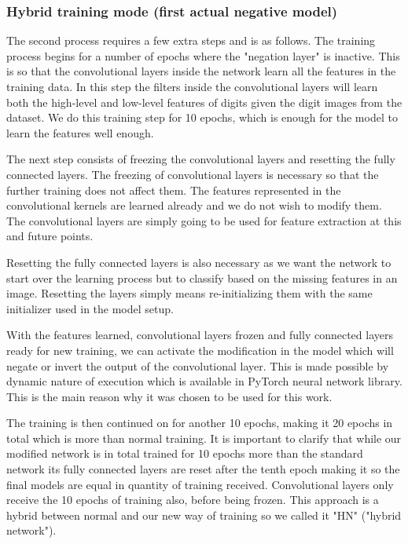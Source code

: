 \documentclass[b5paper]{book}
\begin{document}
\subsubsection{Hybrid training mode (first actual negative model)}

The second process requires a few extra steps and is as follows. The training process begins for a number of epochs where the "negation layer" is inactive. This is so that the convolutional layers inside the network learn all the features in the training data. In this step the filters inside the convolutional layers will learn both the high-level and low-level features of digits given the digit images from the dataset. We do this training step for 10 epochs, which is enough for the model to learn the features well enough.

The next step consists of freezing the convolutional layers and resetting the fully connected layers. The freezing of convolutional layers is necessary so that the further training does not affect them. The features represented in the convolutional kernels are learned already and we do not wish to modify them. The convolutional layers are simply going to be used for feature extraction at this and future points. 

Resetting the fully connected layers is also necessary as we want the network to start over the learning process but to classify based on the missing features in an image. Resetting the layers simply means re-initializing them with the same initializer used in the model setup.

With the features learned, convolutional layers frozen and fully connected layers ready for new training, we can activate the modification in the model which will negate or invert the output of the convolutional layer. This is made possible by dynamic nature of execution which is available in PyTorch neural network library. This is the main reason why it was chosen to be used for this work. 

The training is then continued on for another 10 epochs, making it 20 epochs in total which is more than normal training. It is important to clarify that while our modified network is in total trained for 10 epochs more than the standard network its fully connected layers are reset after the tenth epoch making it so the final models are equal in quantity of training received. Convolutional layers only receive the 10 epochs of training also, before being frozen. This approach is a hybrid between normal and our new way of training so we called it "HN" ("hybrid network").
\end{document}
